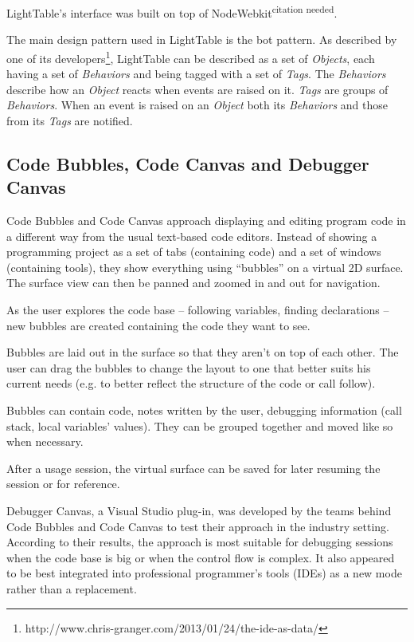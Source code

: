\documentclass{./llncs2e/llncs}
\begin{document}
	LightTable's interface was built on top of NodeWebkit\textsuperscript{citation needed}.

	The main design pattern used in LightTable is the \ac{bot} pattern. As described by one of its developers\footnote{http://www.chris-granger.com/2013/01/24/the-ide-as-data/}, LightTable can be described as a set of \emph{Objects}, each having a set of \emph{Behaviors} and being tagged with a set of \emph{Tags}. The \emph{Behaviors} describe how an \emph{Object} reacts when events are raised on it. \emph{Tags} are groups of \emph{Behaviors}. When an event is raised on an \emph{Object} both its \emph{Behaviors} and those from its \emph{Tags} are notified.


\subsection{Code Bubbles, Code Canvas and Debugger Canvas}
	Code Bubbles and Code Canvas approach displaying and editing program code in a different way from the usual text-based code editors. Instead of showing a programming project as a set of tabs (containing code) and a set of windows (containing tools), they show everything using ``bubbles'' on a virtual 2D surface. The surface view can then be panned and zoomed in and out for navigation.

	As the user explores the code base -- following variables, finding declarations -- new bubbles are created containing the code they want to see.

	Bubbles are laid out in the surface so that they aren't on top of each other. The user can drag the bubbles to change the layout to one that better suits his current needs (e.g. to better reflect the structure of the code or call follow).

	Bubbles can contain code, notes written by the user, debugging information (call stack, local variables' values). They can be grouped together and moved like so when necessary.

	After a usage session, the virtual surface can be saved for later resuming the session or for reference.

	Debugger Canvas, a Visual Studio plug-in, was developed by the teams behind Code Bubbles and Code Canvas to test their approach in the industry setting. According to their results, the approach is most suitable for debugging sessions when the code base is big or when the control flow is complex. It also appeared to be best integrated into professional programmer's tools (IDEs) as a new mode rather than a replacement.
\end{document}
